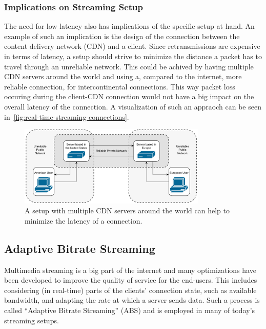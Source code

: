 \subsubsection{Implications on Streaming Setup}
The need for low latency also has implications of the specific setup at hand.
An example of such an implication is the design of the connection between the 
content delivery network (CDN) and a client.
Since retransmissions are expensive in terms of latency, a setup should strive to minimize 
the distance a packet has to travel through an unreliable network.
This could be achived by having multiple CDN servers around the world and using a, compared 
to the internet, more reliable connection, for intercontinental connections.
This way packet loss occuring during the client-CDN connection would not have a big 
impact on the overall latency of the connection.
A visualization of such an appraoch can be seen in~\autoref{fig:real-time-streaming-connections}.

\vspace{0.5cm}
\begin{figure}[htbp] %
    \centering
    \includegraphics[width=0.8\textwidth]{figures/02_background/real-time-streaming-connections.drawio.pdf}
    \caption[Real-time streaming connections]{A setup with multiple CDN servers around the world
    can help to minimize the latency of a connection.}\label{fig:real-time-streaming-connections}
\end{figure}

\subsection{Adaptive Bitrate Streaming}\label{subsec:adaptive_bitrate_streaming}
Multimedia streaming is a big part of the internet and many optimizations have
been developed to improve the quality of service for the end-users.
This includes considering (in real-time) parts of the clients' connection state, 
such as available bandwidth, and adapting the rate at which a server sends data.
Such a process is called ``Adaptive Bitrate Streaming'' (ABS) and is employed in many 
of today's streaming setups.

